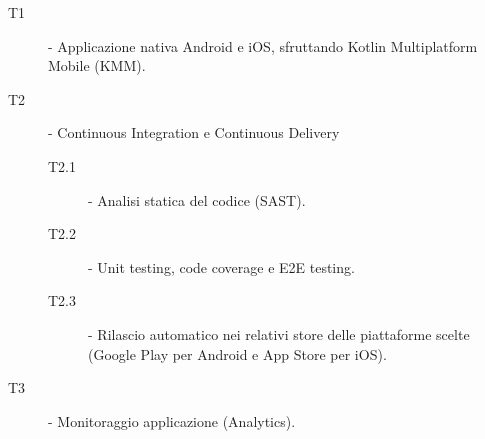 \begin{description}
    \item[T1] - Applicazione nativa Android e iOS, sfruttando Kotlin Multiplatform Mobile (KMM).
    \item[T2] - Continuous Integration e Continuous Delivery
    \begin{description}
        \item[T2.1] - Analisi statica del codice (SAST).
        \item[T2.2] - Unit testing, code coverage e E2E testing.
        \item[T2.3] - Rilascio automatico nei relativi store delle piattaforme scelte (Google Play per Android e App Store per iOS).
    \end{description}
    \item[T3] - Monitoraggio applicazione (Analytics).
\end{description}
